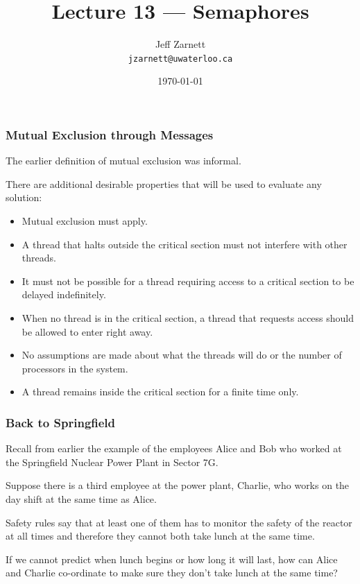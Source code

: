 

\title{Lecture 13 --- Semaphores }

\author{Jeff Zarnett \\ \small \texttt{jzarnett@uwaterloo.ca}}
\date{\today}




\begin{frame}
  \titlepage

 \end{frame}

\begin{frame}
\frametitle{Mutual Exclusion through Messages}

The earlier definition of mutual exclusion was informal.

There are additional desirable properties that will be used to evaluate any solution:
\begin{itemize}
	\item Mutual exclusion must apply.
	\item A thread that halts outside the critical section must not interfere with other threads.
	\item It must not be possible for a thread requiring access to a critical section to be delayed indefinitely.
	\item When no thread is in the critical section, a thread that requests access should be allowed to enter right away.
	\item No assumptions are made about what the threads will do or the number of processors in the system.
	\item A thread remains inside the critical section for a finite time only.
\end{itemize}


\end{frame}

\begin{frame}
\frametitle{Back to Springfield}
Recall from earlier the example of the employees Alice and Bob who worked at the Springfield Nuclear Power Plant in Sector 7G.  

Suppose there is a third employee at the power plant, Charlie, who works on the day shift at the same time as Alice. 

Safety rules say that at least one of them has to monitor the safety of the reactor at all times and therefore they cannot both take lunch at the same time. 

If we cannot predict when lunch begins or how long it will last, how can Alice and Charlie co-ordinate to make sure they don't take lunch at the same time?

\end{frame}

